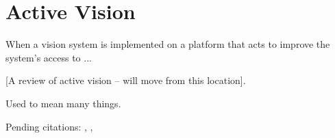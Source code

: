 \section{Active Vision}

When a vision system is implemented on a platform that acts to
improve the system's access to ...

[A review of active vision -- will move from this location].

Used to mean many things.

Pending citations: \cite{tarr94computational},
\cite{tsikos91segmentation},
\cite{bajcsy88active}
\cite{aloimonos87active}
\cite{ballard91animate}
